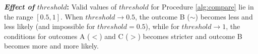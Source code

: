 \documentclass[conference]{IEEEtran}
\newcommand{\p}[1]{{\color{blue} Pdj: #1}}
\begin{document}
%

\textbf{\textit{Effect of }$threshold$:} Valid values of $threshold$ for Procedure \ref{alg:compare} lie in the range $[0.5,1]$. When $threshold \to 0.5$, the outcome B ($\sim$) becomes
less and less likely (and impossible for $threshold=0.5$), while for $threshold \to 1$, the conditions for outcomes A ($<$)
and C ($>$) becomes stricter and outcome B becomes more and more likely. 
\end{document}
